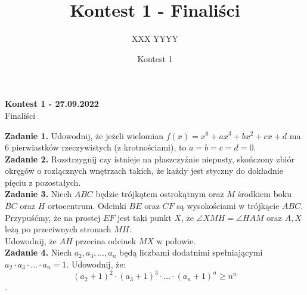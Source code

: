 \documentclass[zad,zawodnik,utf8]{sinol}
\title{Kontest 1 - Finaliści}
\author{XXX YYYY}
\date{Kontest 1}
\begin{document}
    \begin{center}
        \textbf{\huge Kontest 1 - 27.09.2022} \\ 
        \vspace{0.5cm}
        \Large{Finaliści}
    \end{center}
    \Large{
        \textbf{Zadanie 1.} Udowodnij, że jeżeli wielomian $f(x) = x^6 + ax^3 + bx^2 + cx + d$ ma $6$ pierwiastków rzeczywistych (z krotnościami), to $a = b = c = d = 0$. \\
        
        \textbf{Zadanie 2.} Rozstrzygnij czy istnieje na płaszczyźnie niepusty, skończony zbiór okręgów o rozłącznych wnętrzach takich, że każdy jest styczny do dokładnie pięciu z pozostałych. \\
        
        \textbf{Zadanie 3.}  Niech $ABC$ będzie trójkątem ostrokątnym oraz $M$ środkiem boku $BC$ oraz $H$ ortocentrum. Odcinki $BE$ oraz $CF$ są wysokościami w trójkącie $ABC$. Przypuśćmy, że na prostej $EF$ jest taki punkt $X$, że $\angle XMH =\angle HAM$ oraz $A,X$ leżą po przeciwnych stronach $MH$. \\ 
        Udowodnij, że $AH$ przecina odcinek $MX$ w połowie. \\
        
        \textbf{Zadanie 4.} Niech $a_2,a_3,\ldots,a_n$ będą liczbami dodatnimi spełniającymi \\ 
        $a_2 \cdot a_3 \cdot \ldots \cdot a_n=1$. Udowodnij, że: $$(a_2+1)^2\cdot (a_3+1)^3\cdot \ldots \cdot (a_n+1)^n \geq n^n$$.
    }
\end{document}
